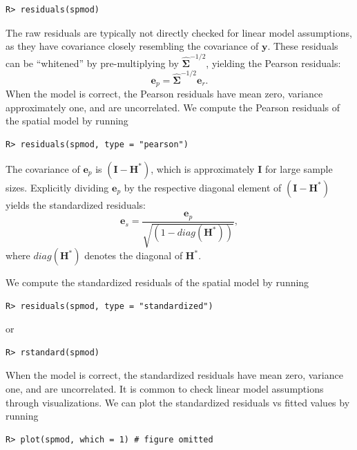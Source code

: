 \documentclass{article}
\begin{document}
\begin{verbatim}
R> residuals(spmod)
\end{verbatim}

The raw residuals are typically not directly checked for linear model
assumptions, as they have covariance closely resembling the covariance
of \(\mathbf{y}\). These residuals can be ``whitened'' by
pre-multiplying by \(\boldsymbol{\hat{\Sigma}}^{-1/2}\), yielding the
Pearson residuals: \begin{equation*}
  \mathbf{e}_{p} = \boldsymbol{\hat{\Sigma}}^{-1/2}\mathbf{e}_{r}.
\end{equation*} When the model is correct, the Pearson residuals have
mean zero, variance approximately one, and are uncorrelated. We compute
the Pearson residuals of the spatial model by running

\begin{verbatim}
R> residuals(spmod, type = "pearson")
\end{verbatim}

The covariance of \(\mathbf{e}_{p}\) is \((\mathbf{I} - \mathbf{H}^*)\),
which is approximately \(\mathbf{I}\) for large sample sizes. Explicitly
dividing \(\mathbf{e}_{p}\) by the respective diagonal element of
\((\mathbf{I} - \mathbf{H}^*)\) yields the standardized residuals:
\begin{equation*}
  \mathbf{e}_{s} = \frac{\mathbf{e}_{p}}{\sqrt{(1 - diag(\mathbf{H}^*))}},
\end{equation*} where \(diag(\mathbf{H}^*)\) denotes the diagonal of
\(\mathbf{H}^*\).

We compute the standardized residuals of the spatial model by running

\begin{verbatim}
R> residuals(spmod, type = "standardized")
\end{verbatim}

or

\begin{verbatim}
R> rstandard(spmod)
\end{verbatim}

When the model is correct, the standardized residuals have mean zero,
variance one, and are uncorrelated. It is common to check linear model
assumptions through visualizations. We can plot the standardized
residuals vs fitted values by running

\begin{verbatim}
R> plot(spmod, which = 1) # figure omitted
\end{verbatim}
\end{document}
